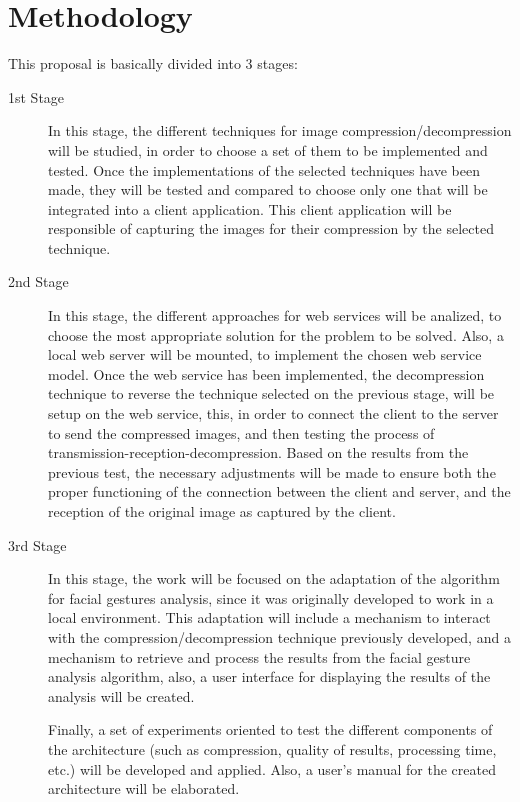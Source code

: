 \documentclass[12pt,letterpaper,titlepage]{article}
\begin{document}
\section{Methodology}
This proposal is basically divided into 3 stages:
\begin{description}
\item[1st Stage] In this stage, the different techniques for image compression/decompression will be studied, in order to choose a set of them to be implemented and tested. Once the implementations of the selected techniques have been made, they will be tested and compared to choose only one that will be integrated into a client application. This client application will be responsible of capturing the images for their compression by the selected technique.

\item[2nd Stage] In this stage, the different approaches for web services will be analized, to choose the most appropriate solution for the problem to be solved. Also, a local web server will be mounted, to implement the chosen web service model. Once the web service has been implemented, the decompression technique to reverse the technique selected on the previous stage, will be setup on the web service, this, in order to connect the client to the server to send the compressed images, and then testing the process of transmission-reception-decompression. Based on the results from the previous test, the necessary adjustments will be made to ensure both the proper functioning of the connection between the client and server, and the reception of the original image as captured by the client.

\item[3rd Stage] In this stage, the work will be focused on the adaptation of the algorithm for facial gestures analysis, since it was originally developed to work in a local environment. This adaptation will include a mechanism to interact with the compression/decompression technique previously developed, and a mechanism to retrieve and process the results from the facial gesture analysis algorithm, also, a user interface for displaying the results of the analysis will be created.

Finally, a set of experiments oriented to test the different components of the architecture (such as compression, quality of results, processing time, etc.) will be developed and applied. Also, a user's manual for the created architecture will be elaborated.
\end{description}
\end{document}
